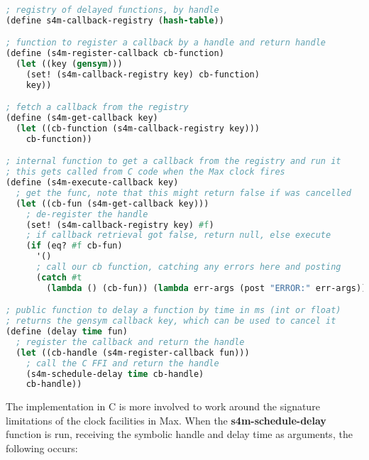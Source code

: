 \documentclass[acmsmall]{acmart}
\begin{document}
\begin{lstlisting}[language=lisp]

; registry of delayed functions, by handle 
(define s4m-callback-registry (hash-table))

; function to register a callback by a handle and return handle
(define (s4m-register-callback cb-function)
  (let ((key (gensym)))
    (set! (s4m-callback-registry key) cb-function)
    key))

; fetch a callback from the registry 
(define (s4m-get-callback key)
  (let ((cb-function (s4m-callback-registry key)))
    cb-function))

; internal function to get a callback from the registry and run it
; this gets called from C code when the Max clock fires
(define (s4m-execute-callback key)
  ; get the func, note that this might return false if was cancelled
  (let ((cb-fun (s4m-get-callback key)))
    ; de-register the handle
    (set! (s4m-callback-registry key) #f)
    ; if callback retrieval got false, return null, else execute 
    (if (eq? #f cb-fun) 
      '()
      ; call our cb function, catching any errors here and posting
      (catch #t 
        (lambda () (cb-fun)) (lambda err-args (post "ERROR:" err-args))))))

; public function to delay a function by time in ms (int or float)
; returns the gensym callback key, which can be used to cancel it
(define (delay time fun)
  ; register the callback and return the handle
  (let ((cb-handle (s4m-register-callback fun)))
    ; call the C FFI and return the handle
    (s4m-schedule-delay time cb-handle)
    cb-handle))

\end{lstlisting}

The implementation in C is more involved to work around the signature 
limitations of the clock facilities in Max.
When the \textbf{s4m-schedule-delay} function is run, receiving the symbolic handle
and delay time as arguments, the following occurs:
\end{document}
